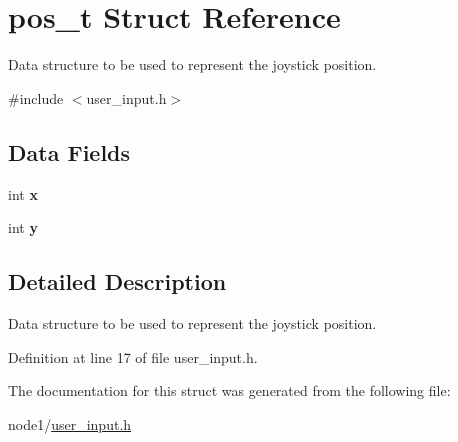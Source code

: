 \hypertarget{structpos__t}{}\section{pos\+\_\+t Struct Reference}
\label{structpos__t}


Data structure to be used to represent the joystick position.  




{\ttfamily \#include $<$user\+\_\+input.\+h$>$}

\subsection*{Data Fields}
\begin{DoxyCompactItemize}
\item 
\mbox{\label{structpos__t_a14d4b6844b7e379dec437af9067beaae}} 
int {\bfseries x}
\item 
\mbox{\label{structpos__t_a5db47caf07f3d2d3c9cb83437e3e9b99}} 
int {\bfseries y}
\end{DoxyCompactItemize}


\subsection{Detailed Description}
Data structure to be used to represent the joystick position. 

Definition at line 17 of file user\+\_\+input.\+h.



The documentation for this struct was generated from the following file\+:\begin{DoxyCompactItemize}
\item 
node1/\hyperlink{node1_2user__input_8h}{user\+\_\+input.\+h}\end{DoxyCompactItemize}
